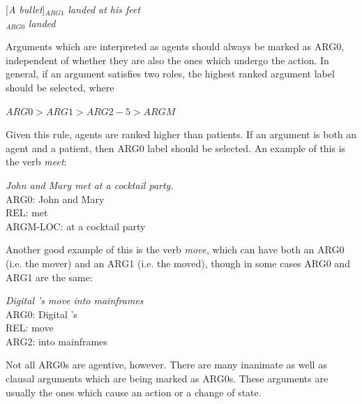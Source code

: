 \documentclass[11pt]{report}
\begin{document}
[\textit{A bullet}]$_{ARG1}$ \textit{landed at his feet} \\ \relax
[\textit{He}]$_{ARG0}$ \textit{landed}

Arguments which are interpreted as agents should always be marked as ARG0, independent of whether they are also the ones which undergo the action.  In general, if an argument satisfies two roles, the highest ranked argument label should be selected, where 

\begin{center}
$ARG0 > ARG1 >  ARG2-5 > ARGM$
\end{center}

Given this rule, agents are ranked higher than patients. If an argument is both an agent and a patient, then ARG0 label should be selected. An example of this is the verb \textit{meet}: 

\textit{John and Mary met at a cocktail party.} \\
ARG0: John and Mary \\
REL: met \\
ARGM-LOC: at a cocktail party 


Another good example of this is the verb \textit{move}, which can have both an ARG0 (i.e. the mover) and an ARG1 (i.e. the moved), though in some cases ARG0 and ARG1 are the same:

\textit{Digital 's move into mainframes} \\
ARG0: Digital 's \\
REL: move \\
ARG2: into mainframes 

Not all ARG0s are agentive, however. There are many inanimate as well as clausal arguments which are being marked as ARG0s. These arguments are usually the ones which cause an action or a change of state.
\end{document}
